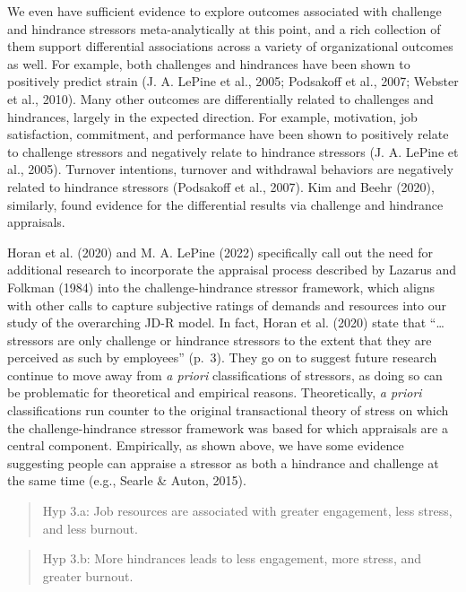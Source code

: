 \documentclass[
  jou,mask]{apa6}
\begin{document}
We even have sufficient evidence to explore outcomes associated with challenge and hindrance stressors meta-analytically at this point, and a rich collection of them support differential associations across a variety of organizational outcomes as well. For example, both challenges and hindrances have been shown to positively predict strain (J. A. LePine et al., 2005; Podsakoff et al., 2007; Webster et al., 2010). Many other outcomes are differentially related to challenges and hindrances, largely in the expected direction. For example, motivation, job satisfaction, commitment, and performance have been shown to positively relate to challenge stressors and negatively relate to hindrance stressors (J. A. LePine et al., 2005). Turnover intentions, turnover and withdrawal behaviors are negatively related to hindrance stressors (Podsakoff et al., 2007). Kim and Beehr (2020), similarly, found evidence for the differential results via challenge and hindrance appraisals.

Horan et al. (2020) and M. A. LePine (2022) specifically call out the need for additional research to incorporate the appraisal process described by Lazarus and Folkman (1984) into the challenge-hindrance stressor framework, which aligns with other calls to capture subjective ratings of demands and resources into our study of the overarching JD-R model. In fact, Horan et al. (2020) state that ``\ldots stressors are only challenge or hindrance stressors to the extent that they are perceived as such by employees'' (p.~3). They go on to suggest future research continue to move away from \emph{a priori} classifications of stressors, as doing so can be problematic for theoretical and empirical reasons. Theoretically, \emph{a priori} classifications run counter to the original transactional theory of stress on which the challenge-hindrance stressor framework was based for which appraisals are a central component. Empirically, as shown above, we have some evidence suggesting people can appraise a stressor as both a hindrance and challenge at the same time (e.g., Searle \& Auton, 2015).

\begin{quote}
Hyp 3.a: Job resources are associated with greater engagement, less stress, and less burnout.
\end{quote}

\begin{quote}
Hyp 3.b: More hindrances leads to less engagement, more stress, and greater burnout.
\end{quote}
\end{document}
